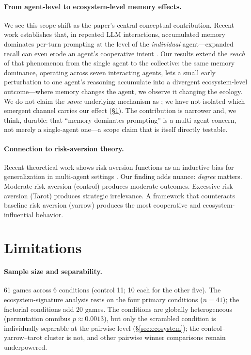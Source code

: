\documentclass[11pt]{article}
\begin{document}
\paragraph{From agent-level to ecosystem-level memory effects.}
We see this scope shift as the paper's central conceptual contribution. Recent work establishes that, in repeated LLM interactions, accumulated memory dominates per-turn prompting at the level of the \emph{individual} agent---expanded recall can even erode an agent's cooperative intent \citep{MemoryCurse2026}. Our results extend the \emph{reach} of that phenomenon from the single agent to the collective: the same memory dominance, operating across seven interacting agents, lets a small early perturbation to one agent's reasoning accumulate into a divergent ecosystem-level outcome---where memory changes the agent, we observe it changing the ecology. We do not claim the \emph{same} underlying mechanism as \citet{MemoryCurse2026}; we have not isolated which emergent channel carries our effect (\S\ref{sec:limitations}). The contribution is narrower and, we think, durable: that ``memory dominates prompting'' is a multi-agent concern, not merely a single-agent one---a scope claim that is itself directly testable.

\paragraph{Connection to risk-aversion theory.}
Recent theoretical work shows risk aversion functions as an inductive bias for generalization in multi-agent settings \citep{Qu2026riskaversion}. Our finding adds nuance: \emph{degree} matters. Moderate risk aversion (control) produces moderate outcomes. Excessive risk aversion (Tarot) produces strategic irrelevance. A framework that counteracts baseline risk aversion (yarrow) produces the most cooperative and ecosystem-influential behavior.


\section{Limitations}
\label{sec:limitations}

\paragraph{Sample size and separability.} 61 games across 6 conditions (control 11; 10 each for the other five). The ecosystem-signature analysis rests on the four primary conditions ($n = 41$); the factorial conditions add 20 games. The conditions are globally heterogeneous (permutation omnibus $p \approx 0.0013$), but only the scrambled condition is individually separable at the pairwise level (\S\ref{sec:ecosystem}); the control--yarrow--tarot cluster is not, and other pairwise winner comparisons remain underpowered.
\end{document}
